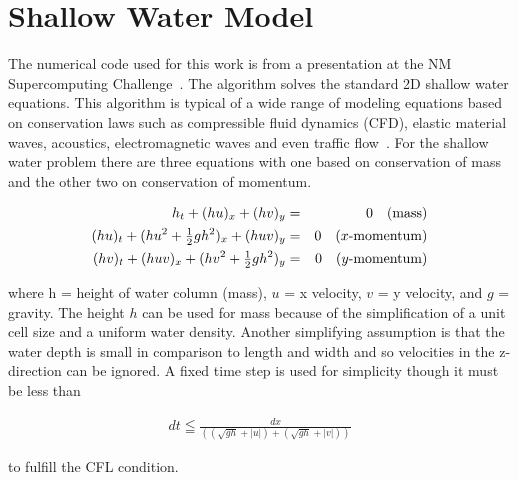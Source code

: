 \section{Shallow Water Model}
\label{sec:shallow-water}

The numerical code used for this work is from a presentation at the NM
Supercomputing Challenge~\citep{Robey07}.  The algorithm solves the
standard 2D shallow water equations. This algorithm is typical of a
wide range of modeling equations based on conservation laws such as
compressible fluid dynamics (CFD), elastic material waves, acoustics,
electromagnetic waves and even traffic flow~\citep{Leveque02}. For the
shallow water problem there are three equations with one based on
conservation of mass and the other two on conservation of momentum.

\begin{eqnarray*}
h_{t}+(hu)_{x}+(hv)_{y} & = & 0\quad\mbox{(mass)}\\
(hu)_{t}+(h{u}^{2}+\tfrac{1}{2}gh^{2})_{x}+(huv)_{y} & = & 0\mbox{\quad($x$-momentum)}\\
(hv)_{t}+(huv)_{x}+(h{v}^{2}+\tfrac{1}{2}gh^{2})_{y} & = & 0\mbox{\quad($y$-momentum)}
\end{eqnarray*}



\noindent
where h = height of water column (mass), $u$ = x velocity, $v$ =
y velocity, and $g$ = gravity. The height $h$ can be used for mass
because of the simplification of a unit cell size and a uniform water
density. Another simplifying assumption is that the water depth is
small in comparison to length and width and so velocities in the z-direction
can be ignored. A fixed time step is used for simplicity though it
must be less than

\begin{eqnarray*}
dt \leqq \frac{dx}{\left(\left(\sqrt{gh}+|u|\right) + \left(\sqrt{gh}+|v|\right)\right)}
\end{eqnarray*}

\noindent to fulfill the CFL condition.

